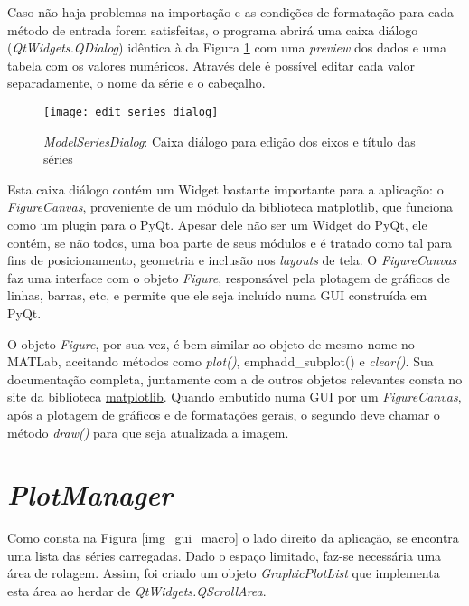 Caso não haja problemas na importação e as condições de formatação para cada método de entrada forem satisfeitas, o programa abrirá uma caixa diálogo (\emph{QtWidgets.QDialog}) idêntica à da Figura \ref{img_edit_series_dialog} com uma \textit{preview} dos dados e uma tabela com os valores numéricos. Através dele é possível editar cada valor separadamente, o nome da série e o cabeçalho.

\begin{figure}[hbt]
	\centering
	\caption{\emph{ModelSeriesDialog}: Caixa diálogo para edição dos eixos e título das séries}
	\texttt{[image: edit\_series\_dialog]}
	\label{img_edit_series_dialog}
\end{figure}

Esta caixa diálogo contém um Widget bastante importante para a aplicação: o \emph{FigureCanvas}, proveniente de um módulo da biblioteca matplotlib, que funciona como um plugin para o PyQt. Apesar dele não ser um Widget do PyQt, ele contém, se não todos, uma boa parte de seus módulos e é tratado como tal para fins de posicionamento, geometria e inclusão nos \textit{layouts} de tela. O \emph{FigureCanvas} faz uma interface com o objeto \emph{Figure}, responsável pela plotagem de gráficos de linhas, barras, etc, e permite que ele seja incluído numa GUI construída em PyQt.

O objeto \emph{Figure}, por sua vez, é bem similar ao objeto de mesmo nome no MATLab\textsuperscript{\tiny \textregistered}, aceitando métodos como \emph{plot()}, emph{add\_subplot()} e \emph{clear()}. Sua documentação completa, juntamente com a de outros objetos relevantes consta no site da biblioteca \href{https://matplotlib.org/}{matplotlib}. Quando embutido numa GUI por um \emph{FigureCanvas}, após a plotagem de gráficos e de formatações gerais, o segundo deve chamar o método \emph{draw()} para que seja atualizada a imagem.


\section{\emph{PlotManager}}

Como consta na Figura \ref{img_gui_macro} o lado direito da aplicação, se encontra uma lista das séries carregadas. Dado o espaço limitado, faz-se necessária uma área de rolagem. Assim, foi criado um objeto \emph{GraphicPlotList} que implementa esta área ao herdar de \emph{QtWidgets.QScrollArea}.


